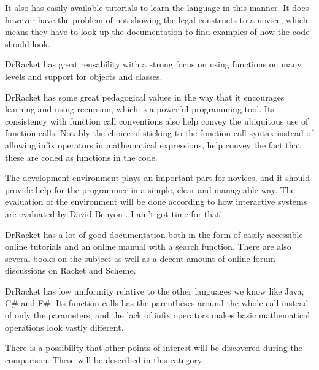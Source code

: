 \begin{description}[style=nextline]
It also has easily available tutorials to learn the language in this manner.
It does however have the problem of not showing the legal constructs to a novice, which means they have to look up the documentation to find examples of how the code should look.
\item[Reusability] DrRacket has great reusability with a strong focus on using functions on many levels and support for objects and classes.
\item[Pedagogic Value] DrRacket has some great pedagogical values in the way that it encourages learning and using recursion, which is a powerful programming tool.
Its consistency with function call conventions also help convey the ubiquitous use of function calls.
Notably the choice of sticking to the function call syntax instead of allowing infix operators in mathematical expressions, help convey the fact that these are coded as functions in the code.
\item[Environment] The development environment plays an important part for novices, and it should provide help for the programmer in a simple, clear and manageable way. The evaluation of the environment will be done according to how interactive systems are evaluated by David Benyon \cite[p. 225-250]{design_book}.
I ain't got time for that!
\item[Documentation] DrRacket has a lot of good documentation both in the form of easily accessible online tutorials and an online manual with a search function.
There are also several books on the subject as well as a decent amount of online forum discussions on Racket and Scheme.
\item[Uniformity] DrRacket has low uniformity relative to the other languages we know like Java, C\# and F\#.
Its function calls has the parentheses around the whole call instead of only the parameters, and the lack of infix operators makes basic mathematical operations look vastly different.
\item[Miscellaneous] There is a possibility that other points of interest will be discovered during the comparison. These will be described in this category.
\end{description}
